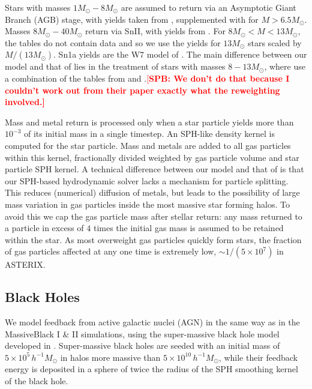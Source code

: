 \documentclass[fleqn,usenatbib]{mnras}
\newcommand{\msunh}{\,h^{-1}\unit{M_\odot}}
\newcommand{\spb}[1]{\textcolor{red}{[\bf SPB: #1]}}
\begin{document}
Stars with masses $1 M_\odot - 8 M_\odot$ are assumed to return via an Asymptotic Giant Branch (AGB) stage, with yields taken from \cite{Karakas:2010}, supplemented with \cite{Doherty:2014a, Doherty:2014b} for $M > 6.5 M_\odot$. Masses $8 M_\odot - 40 M_\odot$  return via SnII, with yields from \cite{Kobayashi:2006}. For $8 M_\odot < M < 13 M_\odot$, the tables do not contain data and so we use the yields for $13 M_\odot$ stars scaled by $M / (13 M_\odot)$. Sn1a yields are the W7 model of \cite{Nomoto:1997}. The main difference between our model and that of \cite{Pillepich:2018} lies in the treatment of stars with masses $8 - 13 M_\odot$, where \cite{Pillepich:2018} use a combination of the tables from \cite{Portinari:1998} and \cite{Karakas:2010}.\spb{We don't do that because I couldn't work out from their paper exactly what the reweighting involved.}

Mass and metal return is processed only when a star particle yields more than $10^{-3}$ of its initial mass in a single timestep. An SPH-like density kernel is computed for the star particle. Mass and metals are added to all gas particles within this kernel, fractionally divided weighted by gas particle volume and star particle SPH kernel. A technical difference between our model and that of \cite{Pillepich:2018} is that our SPH-based hydrodynamic solver lacks a mechanism for particle splitting. This reduces (numerical) diffusion of metals, but leads to the possibility of large mass variation in gas particles inside the most massive star forming halos. To avoid this we cap the gas particle mass after stellar return: any mass returned to a particle in excess of $4$ times the initial gas mass is assumed to be retained within the star. As most overweight gas particles quickly form stars, the fraction of gas particles affected at any one time is extremely low, $\sim 1/(5\times 10^7)$ in ASTERIX.

\subsection{Black Holes}

We model feedback from active galactic nuclei (AGN) in the same way as in the MassiveBlack I \& II simulations, using the super-massive black hole model developed in \cite{2005Natur.433..604D}.
Super-massive black holes are seeded with an initial mass of $5\times10^{5}\msunh$ in halos more massive than $5\times10^{10}\,h^{-1}\unit{M_\odot}$, while
their feedback energy is deposited in a sphere of twice the radius of the SPH smoothing kernel of the black hole.
\end{document}
